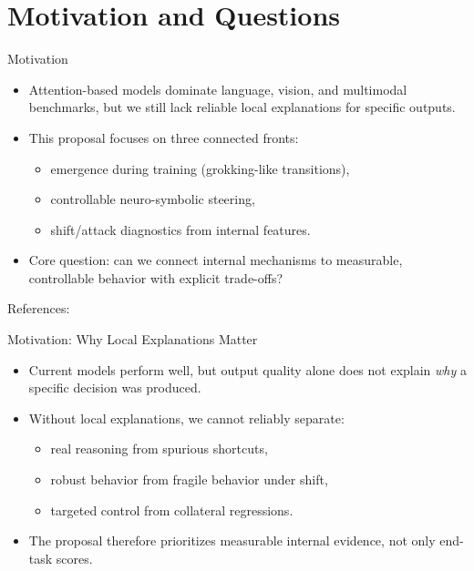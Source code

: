 \section{Motivation and Questions}

\begin{frame}{Motivation}
    \begin{itemize}
        \item Attention-based models dominate language, vision, and multimodal benchmarks, but we still lack reliable local explanations for specific outputs.
        \item This proposal focuses on three connected fronts:
        \begin{itemize}
            \item emergence during training (grokking-like transitions),
            \item controllable neuro-symbolic steering,
            \item shift/attack diagnostics from internal features.
        \end{itemize}
        \item Core question: can we connect internal mechanisms to measurable, controllable behavior with explicit trade-offs?
    \end{itemize}
    \vspace{0.3em}
    \footnotesize References: \cite{vaswani2017attention,brown2020gpt3,openai2023gpt4,kautz2022thirdaisummer}
\end{frame}

\begin{frame}{Motivation: Why Local Explanations Matter}
    \small
    \begin{itemize}
        \item Current models perform well, but output quality alone does not explain \textit{why} a specific decision was produced.
        \item Without local explanations, we cannot reliably separate:
        \begin{itemize}
            \item real reasoning from spurious shortcuts,
            \item robust behavior from fragile behavior under shift,
            \item targeted control from collateral regressions.
        \end{itemize}
        \item The proposal therefore prioritizes measurable internal evidence, not only end-task scores.
    \end{itemize}
\end{frame}

